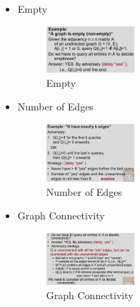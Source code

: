 \begin{itemize}
    \item Empty
    \begin{figure}[H]
        \centering
        \includegraphics[width=0.309\textwidth]{pic/DAA5/Evasive Property exp}
        \caption{Empty}
    \end{figure}
    \item Number of Edges
    \begin{figure}[H]
        \centering
        \includegraphics[width=0.309\textwidth]{pic/DAA5/Number of Edges}
        \caption{Number of Edges}
    \end{figure}
    
    \item Graph Connectivity
    \begin{figure}[H]
        \centering
        \includegraphics[width=0.309\textwidth]{pic/DAA5/Graph Connectivity}
        \caption{Graph Connectivity}
    \end{figure}
    

\end{itemize}
